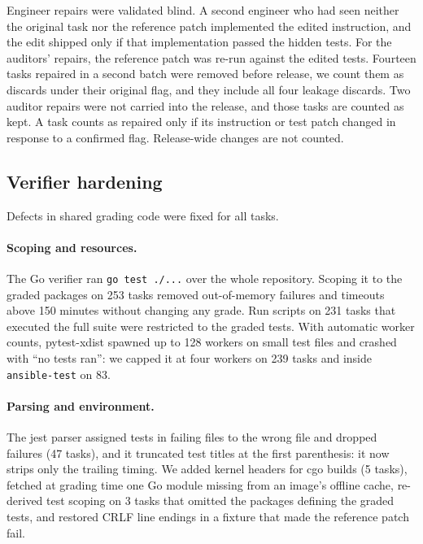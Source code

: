 Engineer repairs were validated blind. A second engineer who had seen neither the original task nor the reference patch implemented the edited instruction, and the edit shipped only if that implementation passed the hidden tests. For the auditors' repairs, the reference patch was re-run against the edited tests. Fourteen tasks repaired in a second batch were removed before release, we count them as discards under their original flag, and they include all four leakage discards. Two auditor repairs were not carried into the release, and those tasks are counted as kept. A task counts as repaired only if its instruction or test patch changed in response to a confirmed flag. Release-wide changes are not counted.

\subsection{Verifier hardening}
\label{sec:verifier}

Defects in shared grading code were fixed for all tasks.

\paragraph{Scoping and resources.}
The Go verifier ran \texttt{go test ./...} over the whole repository. Scoping it to the graded packages on 253 tasks removed out-of-memory failures and timeouts above 150 minutes without changing any grade. Run scripts on 231 tasks that executed the full suite were restricted to the graded tests. With automatic worker counts, pytest-xdist spawned up to 128 workers on small test files and crashed with ``no tests ran'': we capped it at four workers on 239 tasks and inside \texttt{ansible-test} on 83.

\paragraph{Parsing and environment.}
The jest parser assigned tests in failing files to the wrong file and dropped failures (47 tasks), and it truncated test titles at the first parenthesis: it now strips only the trailing timing. We added kernel headers for cgo builds (5 tasks), fetched at grading time one Go module missing from an image's offline cache, re-derived test scoping on 3 tasks that omitted the packages defining the graded tests, and restored CRLF line endings in a fixture that made the reference patch fail.

